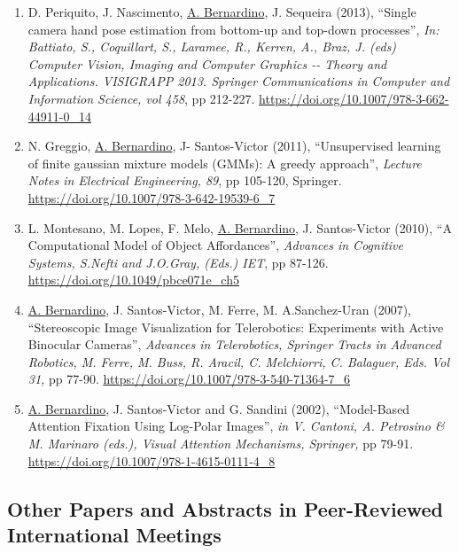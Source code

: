 \begin{enumerate}
{  Serhat Aybat, El-hadi Zahzah (Eds), Chapman \& Hall/CRC}, 34 pages.
  ISBN:1498724620 9781498724623. \url{https://doi.org/10.1201/b20190}
  ~~~
\item
  D. Periquito, J. Nascimento, \ul{A. Bernardino}, J. Sequeira (2013),
  ``Single camera hand pose estimation from bottom-up and top-down
  processes'', \emph{In: Battiato, S., Coquillart, S., Laramee, R.,
  Kerren, A., Braz, J. (eds) Computer Vision, Imaging and Computer
  Graphics -\/- Theory and Applications. VISIGRAPP 2013. Springer
  Communications in Computer and Information Science, vol 458}, pp
  212-227. \url{https://doi.org/10.1007/978-3-662-44911-0_14}~~
\item
  N. Greggio, \ul{A. Bernardino}, J- Santos-Victor (2011),
  ``Unsupervised learning of finite gaussian mixture models (GMMs): A
  greedy approach'', \emph{Lecture Notes in Electrical Engineering, 89},
  pp 105-120, Springer.
  \url{https://doi.org/10.1007/978-3-642-19539-6_7}~
\item
  L. Montesano, M. Lopes, F. Melo, \ul{A. Bernardino}, J. Santos-Victor
  (2010), ``A Computational Model of Object Affordances'',
  \emph{Advances in Cognitive Systems, S.Nefti and J.O.Gray, (Eds.)
  IET}, pp 87-126. \url{https://doi.org/10.1049/pbce071e_ch5}~~
\item
  \ul{A. Bernardino}, J. Santos-Victor, M. Ferre, M. A.Sanchez-Uran
  (2007), ``Stereoscopic Image Visualization for Telerobotics:
  Experiments with Active Binocular Cameras'', \emph{Advances in
  Telerobotics, Springer Tracts in Advanced Robotics, M. Ferre, M. Buss,
  R. Aracil, C. Melchiorri, C. Balaguer, Eds. Vol 31,} pp 77-90.
  \url{https://doi.org/10.1007/978-3-540-71364-7_6}~~~
\item
  \ul{A. Bernardino}, J. Santos-Victor and G. Sandini (2002),
  ``Model-Based Attention Fixation Using Log-Polar Images'', \emph{in V.
  Cantoni, A. Petrosino \& M. Marinaro (eds.), Visual Attention
  Mechanisms, Springer,} pp 79-91.
  \url{https://doi.org/10.1007/978-1-4615-0111-4_8}~
\end{enumerate}

\subsection{Other Papers and Abstracts in Peer-Reviewed International
Meetings}\label{other-papers-and-abstracts-in-peer-reviewed-international-meetings}

